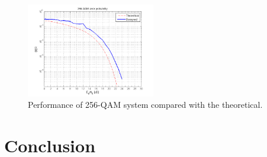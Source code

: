 \documentclass[12pt,a4paper,openright]{report}
\begin{document}
% 

 \begin{figure}[H]
  \centering
    \includegraphics[width=0.5\textwidth]{BERuncoded.png}
    \caption[Performance of 256-QAM system]{Performance of 256-QAM system compared with the theoretical.}
    \label{fig:MQAMperf}
\end{figure}



\chapter{Conclusion}
\end{document}

